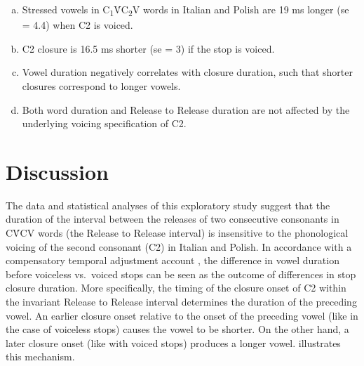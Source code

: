 \documentclass[preprint]{JASAnew}
\begin{document}
\begin{enumerate}[(a)]
  \item Stressed vowels in C\textsubscript{1}V́C\textsubscript{2}V words in Italian and Polish are 19 ms longer (se = 4.4) when C2 is voiced.
  \item C2 closure is 16.5 ms shorter (se = 3) if the stop is voiced.
  \item Vowel duration negatively correlates with closure duration, such that shorter closures correspond to longer vowels.
  \item Both word duration and Release to Release duration are not affected by the underlying voicing specification of C2.
\end{enumerate}

\hypertarget{discussion}{%
\section{Discussion}\label{discussion}}

The data and statistical analyses of this exploratory study suggest that
the duration of the interval between the releases of two consecutive
consonants in CV́CV words (the Release to Release interval) is
insensitive to the phonological voicing of the second consonant (C2) in
Italian and Polish. In accordance with a compensatory temporal
adjustment account \citep{slis1969, lehiste1970}, the difference in
vowel duration before voiceless vs.~voiced stops can be seen as the
outcome of differences in stop closure duration. More specifically, the
timing of the closure onset of C2 within the invariant Release to
Release interval determines the duration of the preceding vowel. An
earlier closure onset relative to the onset of the preceding vowel (like
in the case of voiceless stops) causes the vowel to be shorter. On the
other hand, a later closure onset (like with voiced stops) produces a
longer vowel.  illustrates this mechanism.
\end{document}
